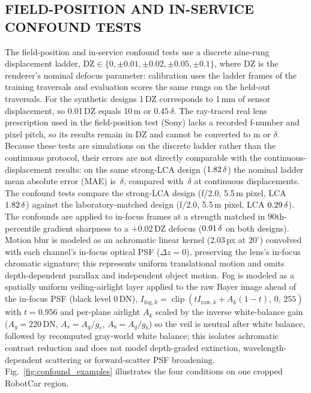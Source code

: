 \documentclass{ieee-ojvt}
\begin{document}
\subsection{FIELD-POSITION AND IN-SERVICE CONFOUND TESTS}
The field-position and in-service confound tests use a discrete nine-rung displacement ladder, $\mathrm{DZ}\in\{0,\pm0.01,\pm0.02,\pm0.05,\pm0.1\}$, where DZ is the renderer's nominal defocus parameter: calibration uses the ladder frames of the training traversals and evaluation scores the same rungs on the held-out traversals. For the synthetic designs 1\,DZ corresponds to 1\,mm of sensor displacement, so 0.01\,DZ equals 10\,\textmu m or $0.45\,\delta$. The ray-traced real lens prescription used in the field-position test (Sony) lacks a recorded f-number and pixel pitch, so its results remain in DZ and cannot be converted to \textmu m or $\delta$. Because these tests are simulations on the discrete ladder rather than the continuous protocol, their errors are not directly comparable with the continuous-displacement results: on the same strong-LCA design ($1.82\,\delta$) the nominal ladder mean absolute error (MAE) is \MsixMaeNominal\,$\delta$, compared with \MtwoMaeDelta\,$\delta$ at continuous displacements. The confound tests compare the strong-LCA design (f/2.0, 5.5\,\textmu m pixel, LCA $1.82\,\delta$) against the laboratory-matched design (f/2.0, 5.5\,\textmu m pixel, LCA $0.29\,\delta$). The confounds are applied to in-focus frames at a strength matched in 90th-percentile gradient sharpness to a $+0.02$\,DZ defocus ($0.91\,\delta$ on both designs). Motion blur is modeled as an achromatic linear kernel (2.03\,px at $20^\circ$) convolved with each channel's in-focus optical PSF ($\Delta z=0$), preserving the lens's in-focus chromatic signature; this represents uniform translational motion and omits depth-dependent parallax and independent object motion. Fog is modeled as a spatially uniform veiling-airlight layer applied to the raw Bayer image ahead of the in-focus PSF (black level $0$\,DN), $I_{\mathrm{fog},k}=\operatorname{clip}(tI_{\mathrm{raw},k}+A_k(1-t),\,0,\,255)$ with $t=0.956$ and per-plane airlight $A_k$ scaled by the inverse white-balance gain ($A_g=220$\,DN, $A_r=A_g/g_r$, $A_b=A_g/g_b$) so the veil is neutral after white balance, followed by recomputed gray-world white balance; this isolates achromatic contrast reduction and does not model depth-graded extinction, wavelength-dependent scattering or forward-scatter PSF broadening. Fig.~\ref{fig:confound_examples} illustrates the four conditions on one cropped RobotCar region.
\end{document}
